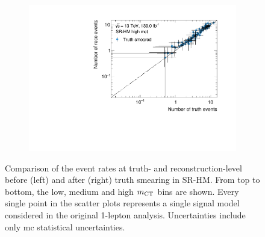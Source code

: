 \begin{figure}
\begin{subfigure}[b]{0.49\linewidth}
	\end{subfigure}\hfill
	\begin{subfigure}[b]{0.49\linewidth}
		\centering\includegraphics[width=\textwidth]{yields_SR-HM_high_mct_smeared}
	\end{subfigure}
	\caption{Comparison of the event rates at truth- and reconstruction-level before (left) and after (right) truth smearing in SR-HM. From top to bottom, the low, medium and high $m_{\textrm{CT}}$ bins are shown. Every single point in the scatter plots represents a single signal model considered in the original 1-lepton analysis. Uncertainties include only \gls{mc} statistical uncertainties.}
	\label{fig:smearing_signal_regions_3}
\end{figure}



